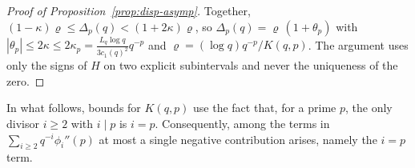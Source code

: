 \begin{proof}[Proof of Proposition~\ref{prop:disp-asymp}]
Together, $(1-\kappa)\varrho\le\Delta_p(q)<(1+2\kappa)\varrho$, so $\Delta_p(q)=\varrho\,(1+\theta_p)$ with $|\theta_p|\le2\kappa\le2\kappa_p=\frac{L_q\log q}{3c_1(q)^2}q^{-p}$ and $\varrho=(\log q)q^{-p}/K(q,p)$. The argument uses only the signs of $H$ on two explicit subintervals and never the uniqueness of the zero.
\end{proof}


\begin{remark}\label{rem:standing-K}
In what follows, bounds for $K(q,p)$ use the fact that, for a prime $p$, the only divisor $i\ge 2$ with $i\mid p$ is $i=p$. Consequently, among the terms in $\sum_{i\ge 2} q^{-i}\phi_i''(p)$ at most a single negative contribution arises, namely the $i=p$ term.
\end{remark}


